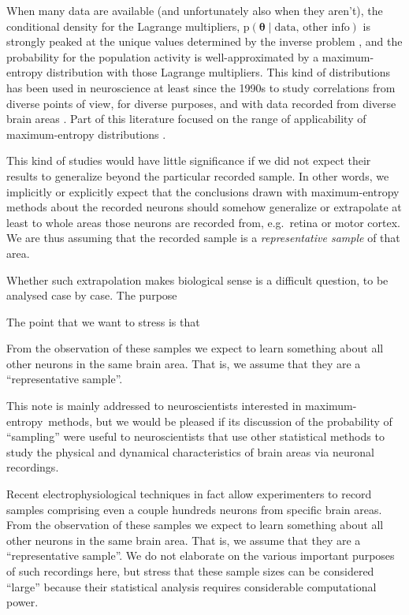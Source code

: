 \documentclass{article}
\theoremstyle{remark}
\theoremstyle{innote}
\newcommand*{\citep}{\parencites}
\renewcommand*{\cite}{\citep}
\renewcommand*{\|}{\mathpunct{|}}%
\newcommand*{\pf}{\mathrm{p}}%
\newcommand*{\eg}{{e.g.}}
\theoremstyle{simple}
\newcommand*{\me}{maximum-entropy}
\newcommand*{\ytheta}{\bm{\theta}}
\begin{document}
When many data are available (and unfortunately also when they aren't), the
conditional density for the Lagrange multipliers,
$\pf(\ytheta\| \text{data, other info})$ is strongly peaked at the unique
values determined by the inverse problem \cite{meadetal1984}, and the
probability for the population activity is well-approximated by a
maximum-entropy distribution \cite{jaynes1957,sivia1996_r2006,meadetal1984}
with those Lagrange multipliers. This kind of distributions has been used
in neuroscience at least since the 1990s to study correlations from diverse
points of view, for diverse purposes, and with data recorded from diverse
brain areas
\cite{mackay1991,martignonetal1995,bohteetal2000,amarietal2003,schneidmanetal2006,shlensetal2006,mackeetal2009b,roudietal2009c,tkaciketal2009,gerwinnetal2009,mackeetal2011,mackeetal2011b,ganmoretal2011,granotatedgietal2013,tkaciketal2014b,moraetal2015,shimazakietal2015}.
Part of this literature focused on the range of applicability of maximum-entropy
distributions
\cite{tkaciketal2006,roudietal2009,roudietal2009b,barreiroetal2010b,mackeetal2013}.

This kind of studies would have little significance if we did not expect
their results to generalize beyond the particular recorded sample. In other
words, we implicitly or explicitly expect that the conclusions drawn with
maximum-entropy methods about the recorded neurons should somehow
generalize or extrapolate at least to whole areas those neurons are recorded from,
\eg\ retina or motor cortex. We are thus assuming that the recorded sample
is a \emph{representative sample} of that area.

Whether such extrapolation makes biological sense is a difficult question,
to be analysed case by case. The purpose

The point that we want to stress is that


From the observation of these samples we expect
to learn something about all other neurons in the same brain area. That is,
we assume that they are a \enquote{representative sample}.


This note is mainly addressed to neuroscientists interested in \me\
methods, but we would be pleased if its discussion of the probability of
\enquote{sampling} were useful to neuroscientists that use other
statistical methods to study the physical and dynamical characteristics of
brain areas via neuronal recordings.

Recent electrophysiological techniques \cite{berenyietal2014} in fact allow
experimenters to record samples comprising even a couple hundreds neurons
from specific brain areas. From the observation of these samples we expect
to learn something about all other neurons in the same brain area. That is,
we assume that they are a \enquote{representative sample}. We do not
elaborate on the various important purposes of such recordings here, but
stress that these sample sizes can be considered \enquote{large} because
their statistical analysis requires considerable computational power.
\end{document}
